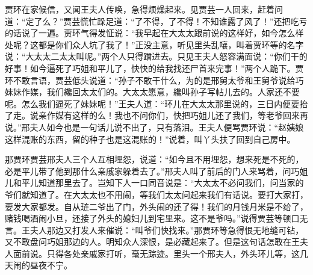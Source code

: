 \begin{parag}
    贾环在家候信，又闻王夫人传唤，急得烦燥起来。见贾芸一人回来，赶着问道：“定了么？”贾芸慌忙跺足道：“了不得，了不得！不知谁露了风了！”还把吃亏的话说了一遍。贾环气得发怔说：“我早起在大太太跟前说的这样好，如今怎么样处呢？这都是你们众人坑了我了！”正没主意，听见里头乱嚷，叫着贾环等的名字说：“大太太二太太叫呢。”两个人只得蹭进去。只见王夫人怒容满面说：“你们干的好事！如今逼死了巧姐和平儿了，快快的给我找还尸首来完事！”两个人跪下。贾环不敢言语，贾芸低头说道：“孙子不敢干什么，为的是邢舅太爷和王舅爷说给巧妹妹作媒，我们纔回太太们的。大太太愿意，纔叫孙子写帖儿去的。人家还不要呢。怎么我们逼死了妹妹呢！”王夫人道：“环儿在大太太那里说的，三日内便要抬了走。说亲作媒有这样的么！我也不问你们，快把巧姐儿还了我们，等老爷回来再说。”邢夫人如今也是一句话儿说不出了，只有落泪。王夫人便骂贾环说：“赵姨娘这样混账的东西，留的种子也是这混账的！”说着，叫丫头扶了回到自己房中。
\end{parag}


\begin{parag}
    那贾环贾芸邢夫人三个人互相埋怨，说道：“如今且不用埋怨，想来死是不死的，必是平儿带了他到那什么亲戚家躲着去了。”邢夫人叫了前后的门人来骂着，问巧姐儿和平儿知道那里去了。岂知下人一口同音说是：“大太太不必问我们，问当家的爷们就知道了。在大太太也不用闹，等我们太太问起来我们有话说。要打大家打，要发大家都发。自从琏二爷出了门，外头闹的还了得！我们的月钱月米是不给了，赌钱喝酒闹小旦，还接了外头的媳妇儿到宅里来。这不是爷吗。”说得贾芸等顿口无言。王夫人那边又打发人来催说：“叫爷们快找来。”那贾环等急得恨无地缝可钻，又不敢盘问巧姐那边的人。明知众人深恨，是必藏起来了。但是这句话怎敢在王夫人面前说。只得各处亲戚家打听，毫无踪迹。里头一个邢夫人，外头环儿等，这几天闹的昼夜不宁。
\end{parag}


